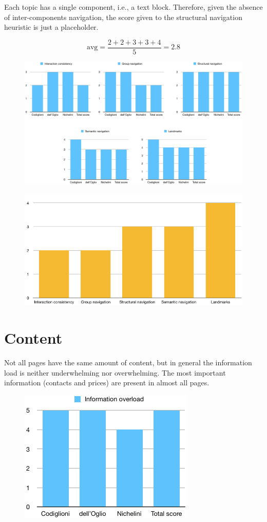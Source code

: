 \documentclass[a4paper, 11pt, parskip=half, headsepline]{scrreprt}
\begin{document}
Each topic has a single component, i.e., a text block. Therefore, given the absence of inter-components navigation, the score given to the structural navigation heuristic is just a placeholder.

\[ \mathrm{avg} = \frac{2+2+3+3+4}{5} = 2.8 \]

\begin{figure}[H]
    \centering
    \includegraphics[width=1\linewidth, keepaspectratio]{navigation-graph-1}
\end{figure}

\begin{figure}[H]
    \centering
    \includegraphics[width=0.7\linewidth, keepaspectratio]{navigation-graph-2}
\end{figure}

\section{Content}

Not all pages have the same amount of content, but in general the information load is neither underwhelming nor overwhelming. The most important information (contacts and prices) are present in almost all pages.

\begin{figure}[H]
    \centering
    \includegraphics[width=0.35\linewidth, keepaspectratio]{content-graph}
\end{figure}
\end{document}
